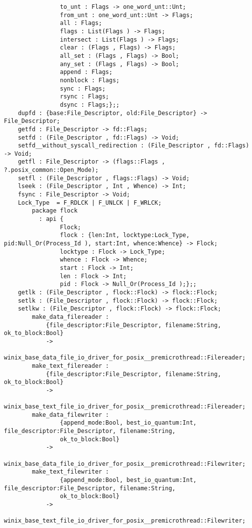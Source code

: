 \begin{verbatim}
                to_unt : Flags -> one_word_unt::Unt;
                from_unt : one_word_unt::Unt -> Flags;
                all : Flags;
                flags : List(Flags ) -> Flags;
                intersect : List(Flags ) -> Flags;
                clear : (Flags , Flags) -> Flags;
                all_set : (Flags , Flags) -> Bool;
                any_set : (Flags , Flags) -> Bool;
                append : Flags;
                nonblock : Flags;
                sync : Flags;
                rsync : Flags;
                dsync : Flags;};;
    dupfd : {base:File_Descriptor, old:File_Descriptor} -> File_Descriptor;
    getfd : File_Descriptor -> fd::Flags;
    setfd : (File_Descriptor , fd::Flags) -> Void;
    setfd__without_syscall_redirection : (File_Descriptor , fd::Flags) -> Void;
    getfl : File_Descriptor -> (flags::Flags , ?.posix_common::Open_Mode);
    setfl : (File_Descriptor , flags::Flags) -> Void;
    lseek : (File_Descriptor , Int , Whence) -> Int;
    fsync : File_Descriptor -> Void;
    Lock_Type  = F_RDLCK | F_UNLCK | F_WRLCK;
        package flock
          : api {
                Flock;
                flock : {len:Int, locktype:Lock_Type, pid:Null_Or(Process_Id ), start:Int, whence:Whence} -> Flock;
                locktype : Flock -> Lock_Type;
                whence : Flock -> Whence;
                start : Flock -> Int;
                len : Flock -> Int;
                pid : Flock -> Null_Or(Process_Id );};;
    getlk : (File_Descriptor , flock::Flock) -> flock::Flock;
    setlk : (File_Descriptor , flock::Flock) -> flock::Flock;
    setlkw : (File_Descriptor , flock::Flock) -> flock::Flock;
        make_data_filereader :
            {file_descriptor:File_Descriptor, filename:String, ok_to_block:Bool}
            ->
            winix_base_data_file_io_driver_for_posix__premicrothread::Filereader;
        make_text_filereader :
            {file_descriptor:File_Descriptor, filename:String, ok_to_block:Bool}
            ->
            winix_base_text_file_io_driver_for_posix__premicrothread::Filereader;
        make_data_filewriter :
                {append_mode:Bool, best_io_quantum:Int, file_descriptor:File_Descriptor, filename:String,
                ok_to_block:Bool}
            ->
            winix_base_data_file_io_driver_for_posix__premicrothread::Filewriter;
        make_text_filewriter :
                {append_mode:Bool, best_io_quantum:Int, file_descriptor:File_Descriptor, filename:String,
                ok_to_block:Bool}
            ->
            winix_base_text_file_io_driver_for_posix__premicrothread::Filewriter;

\end{verbatim}
